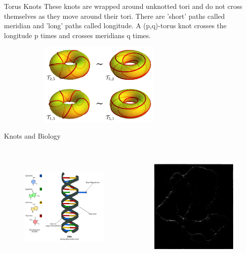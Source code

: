 \begin{frame}{Torus Knots}
These knots are wrapped around unknotted tori and do not cross themselves as they move around their tori. There are 'short' paths called meridian and 'long' paths called longitude. A (p,q)-torus knot crosses the longitude p times and crosses meridians q times.
\begin{figure}
    \centering
    \includegraphics[height= 4cm, width=8cm]{images/torus.png}
    \label{torus}
   
\end{figure}
\cite{article}    
\end{frame}
\begin{frame}{Knots and Biology}
\begin{columns}[T]
\begin{column}{.48\textwidth}
\cite{555w}
\begin{figure}
    \centering
    \includegraphics[width= 6cm,height=5.5cm]{images/dnastring.png}
    \label{dnast}
\end{figure}
\end{column}
\begin{column}{.48\textwidth}
\cite{adams2004knot}
\begin{figure}[h]
    \centering
    \includegraphics[width= 6cm,height=5.5cm]{images/electron.png}
    \label{elec}
\end{figure}
\end{column}
\end{columns}
\end{frame}
